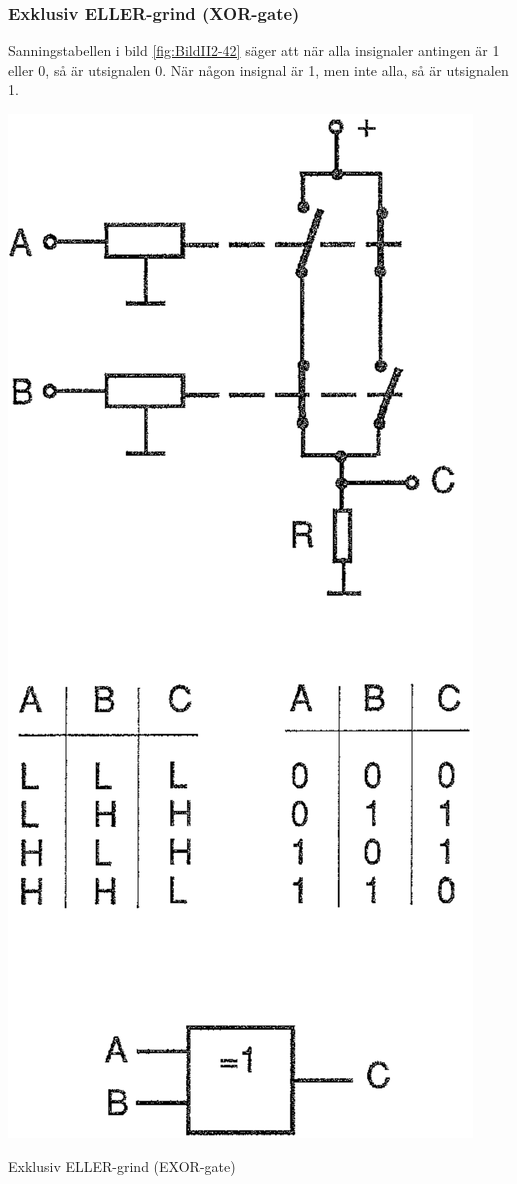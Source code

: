 \subsubsection{Exklusiv ELLER-grind (XOR-gate)}

Sanningstabellen i bild \ref{fig:BildII2-42} säger att när alla
insignaler antingen är 1 eller 0, så är utsignalen 0. När någon
insignal är 1, men inte alla, så är utsignalen 1.

\begin{marginfigure}%
  \includegraphics[width=.7\textwidth]{images/cropped_pdfs/bild_2_2-42.pdf}
  \caption{Exklusiv ELLER-grind (EXOR-gate)}
  \label{fig:BildII2-42}
\end{marginfigure}


